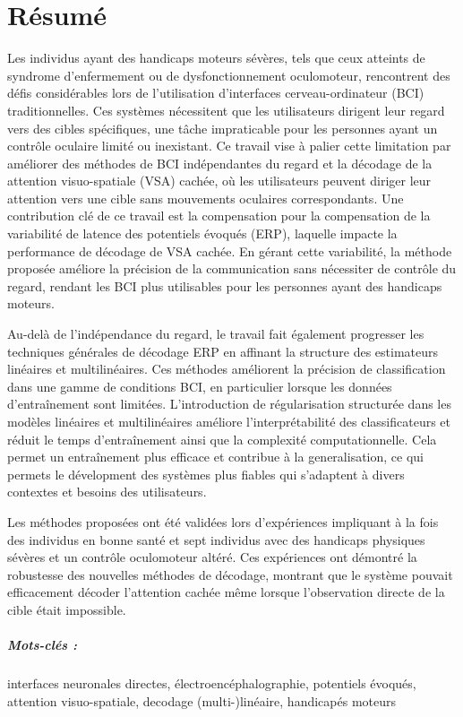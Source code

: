 \chapter*{R\'esum\'e}
Les individus ayant des handicaps moteurs sévères, tels que ceux atteints de
syndrome d'enfermement ou de dysfonctionnement oculomoteur, rencontrent des défis considérables
lors de l'utilisation d'interfaces cerveau-ordinateur (BCI)  traditionnelles.
Ces systèmes nécessitent que les utilisateurs dirigent leur regard vers des
cibles spécifiques, une tâche impraticable pour les personnes ayant un contrôle oculaire limité ou inexistant.
Ce travail vise \`a palier cette limitation par améliorer des méthodes de BCI
indépendantes du regard et la décodage de la attention visuo-spatiale (VSA) cachée, où les utilisateurs peuvent diriger leur attention vers une cible sans mouvements oculaires correspondants.
Une contribution clé de ce travail est la compensation pour la compensation de
la variabilité de latence des potentiels évoqués (ERP), laquelle impacte
la performance de décodage de VSA cachée.
En gérant cette variabilit\'e, la méthode proposée améliore la précision de la communication
sans nécessiter de contrôle du regard, rendant les BCI plus utilisables pour les personnes ayant des handicaps moteurs.

Au-delà de l'indépendance du regard, le travail fait également progresser les
techniques générales de décodage ERP en affinant la structure des estimateurs
linéaires et multilinéaires.
Ces méthodes améliorent la précision de classification dans une gamme de
conditions BCI, en particulier lorsque les données d'entraînement sont limitées.
L'introduction de régularisation structurée dans les modèles linéaires et
multilinéaires améliore l'interprétabilité des classificateurs et réduit le temps d'entraînement ainsi que la complexité computationnelle.
Cela permet un entraînement plus efficace et contribue à la generalisation, ce qui
permets le d\'evelopment des systèmes plus fiables qui s'adaptent à divers
contextes et besoins des utilisateurs.

Les méthodes proposées ont été validées lors d'expériences impliquant à la fois
des individus en bonne santé et sept individus avec des handicaps physiques sévères et un contrôle oculomoteur altéré.
Ces expériences ont démontré la robustesse des nouvelles méthodes de décodage, montrant que le système pouvait efficacement décoder l'attention cachée même lorsque l'observation directe de la cible  était impossible.

\paragraph{Mots-clés :}
interfaces neuronales directes,
\'electroenc\'ephalographie,
potentiels \'evoqu\'es,
attention visuo-spatiale,
decodage (multi-)linéaire,
handicap\'es moteurs
